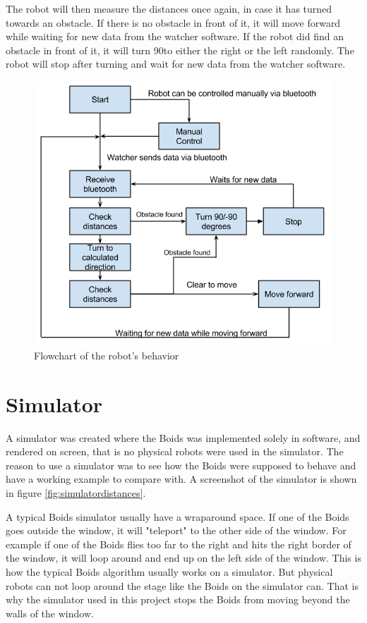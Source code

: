 The robot will then measure the distances once again, in case it has turned towards an obstacle. If there is no obstacle in front of it, it will move forward while waiting for new data from the watcher software. If the robot did find an obstacle in front of it, it will turn 90\textdegree to either the right or the left randomly. The robot will stop after turning and wait for new data from the watcher software. 
\begin{figure}[h!]
\begin{center}
\includegraphics[width=0.8\linewidth]{figs/robotschema}
\end{center}
\caption[Robot flowchart]{Flowchart of the robot's behavior}
\label{fig:robotschema}
\end{figure}
\clearpage

\section{Simulator}
A simulator was created where the Boids was implemented solely in software, and rendered on screen, that is no physical robots were used in the simulator. The reason to use a simulator was to see how the Boids were supposed to behave and have a working example to compare with. A screenshot of the simulator is shown in figure \ref{fig:simulatordistances}.

A typical Boids simulator usually have a wraparound space. If one of the Boids goes outside the window, it will "teleport" to the other side of the window. For example if one of the Boids flies too far to the right and hits the right border of the window, it will loop around and end up on the left side of the window. This is how the typical Boids algorithm usually works on a simulator. But physical robots can not loop around the stage like the Boids on the simulator can. That is why the simulator used in this project stops the Boids from moving beyond the walls of the window.

